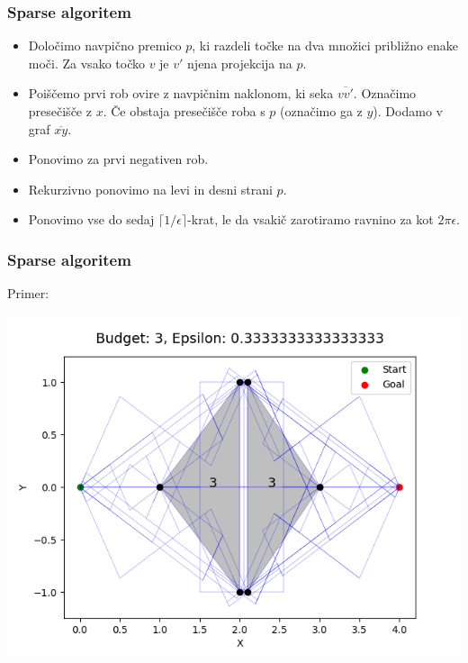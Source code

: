 \documentclass{beamer}
\begin{document}
\begin{frame}
    \frametitle{Sparse algoritem}
    
    \begin{itemize}

        \item Določimo navpično premico $p$, ki razdeli točke na dva množici približno enake moči.
        Za vsako točko $v$ je $v'$ njena projekcija na $p$. 
        \pause

        \item  Poiščemo prvi rob ovire z navpičnim naklonom, ki seka $\overline{vv'}$. Označimo presečišče z $x$. Če obstaja presečišče roba s $p$ (označimo ga z $y$). Dodamo v graf $\overline{xy}$.
        \pause
        \item  Ponovimo za prvi negativen rob.
        \pause
        \item  Rekurzivno ponovimo na levi in desni strani $p$.
        \pause
        \item Ponovimo vse do sedaj $\lceil 1/\epsilon\rceil$-krat, le da vsakič zarotiramo ravnino za kot $2\pi \epsilon$. 
    \end{itemize} 

\end{frame}

\begin{frame}
    \frametitle{Sparse algoritem}
    
    Primer:

    \includegraphics[width=1\textwidth]{sparseGraph.png}

\end{frame}
\end{document}
